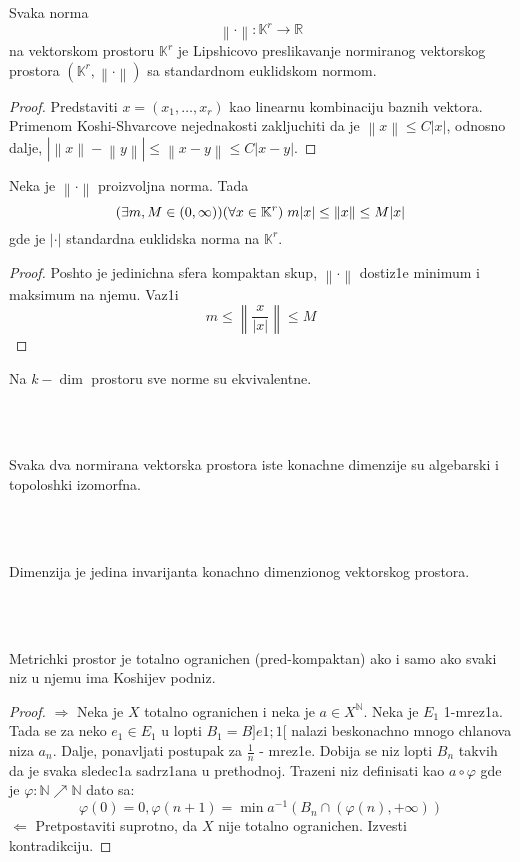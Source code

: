 \documentclass[a4paper,12pt]{article}
\newcommand{\NN}{\mathbb{N}}
\newcommand{\RR}{\mathbb{R}}
\newcommand{\norm}[1]{\left\lVert#1\right\rVert}
\begin{document}
\begin{lema}
Svaka norma 
\[\norm{\cdot} : \mathbb{K}^r \to \RR \]
na vektorskom prostoru $\mathbb{K}^r$ je Lipshicovo preslikavanje normiranog vektorskog prostora $(\mathbb{K}^r, \norm{\cdot})$ sa standardnom euklidskom normom.
\end{lema}
\begin{proof}
Predstaviti $x = (x_1, \dots, x_r)$ kao linearnu kombinaciju baznih vektora. Primenom Koshi-Shvarcove nejednakosti zakljuchiti da je $\norm{x} \leq C |x|$, odnosno dalje, $|\norm{x} - \norm{y} | \leq \norm{x-y} \leq C |x-y|$.
\end{proof}

\begin{tvr}
Neka je $\norm{\cdot}$ proizvoljna norma. Tada 
\[(\exists m,M \in (0,\infty) ) (\forall x \in \mathbb{K}^r) \hspace{0.1cm} m|x| \leq \norm{x} \leq M|x| \]
gde je $|\cdot|$ standardna euklidska norma na $\mathbb{K}^r$.
\end{tvr}
\begin{proof}
Poshto je jedinichna sfera kompaktan skup, $\norm{\cdot}$ dostiz1e minimum i maksimum na njemu. Vaz1i
 \[ m \leq \norm{\frac{x}{|x|}} \leq M\]
\end{proof}

\begin{nap}
Na $k-\dim$ prostoru sve norme su ekvivalentne.
\end{nap}
\\ \\
\begin{posl}
Svaka dva normirana vektorska prostora iste konachne dimenzije su algebarski i topoloshki izomorfna.
\end{posl}
\\ \\
\begin{nap}
Dimenzija je jedina invarijanta konachno dimenzionog vektorskog prostora.
\end{nap}
\\ \\
\begin{tvr}
Metrichki prostor je totalno ogranichen (pred-kompaktan) ako i samo ako svaki niz u njemu ima Koshijev podniz.
\end{tvr}
\begin{proof}
$\boxed{\Rightarrow}$ Neka je $X$ totalno ogranichen i neka je $a \in X^{\NN}$. Neka je $E_1$ 1-mrez1a. Tada se za neko $e_1 \in E_1$ u lopti $B_1 = B]e1;1[$ nalazi beskonachno mnogo chlanova niza $a_n$. Dalje, ponavljati postupak za $\frac{1}{n}$ - mrez1e. Dobija se niz lopti $B_n$ takvih da je svaka sledec1a sadrz1ana u prethodnoj. Trazeni niz definisati kao $a \circ \varphi$ gde je $\varphi: \NN \nearrow \NN$ dato sa: \[\varphi(0) = 0, \varphi(n+1) = \min a^{-1} (B_n \cap (\varphi(n), + \infty))\]
$\boxed{\Leftarrow}$ Pretpostaviti suprotno, da $X$ nije totalno ogranichen. Izvesti kontradikciju.
\end{proof}
\end{document}
